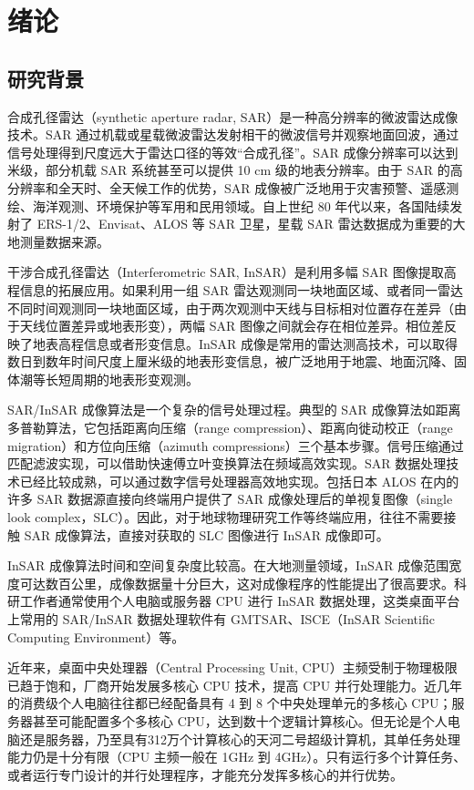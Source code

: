 \chapter{绪论}


\section{研究背景}

合成孔径雷达（synthetic aperture radar, SAR）是一种高分辨率的微波雷达成像技术。SAR 通过机载或星载微波雷达发射相干的微波信号并观察地面回波，通过信号处理得到尺度远大于雷达口径的等效“合成孔径”。SAR 成像分辨率可以达到米级，部分机载 SAR 系统甚至可以提供 10 cm 级的地表分辨率。由于 SAR 的高分辨率和全天时、全天候工作的优势，SAR 成像被广泛地用于灾害预警、遥感测绘、海洋观测、环境保护等军用和民用领域。自上世纪 80 年代以来，各国陆续发射了 ERS-1/2、Envisat、ALOS 等 SAR 卫星，星载 SAR 雷达数据成为重要的大地测量数据来源。

干涉合成孔径雷达（Interferometric SAR, InSAR）是利用多幅 SAR 图像提取高程信息的拓展应用。如果利用一组 SAR 雷达观测同一块地面区域、或者同一雷达不同时间观测同一块地面区域，由于两次观测中天线与目标相对位置存在差异（由于天线位置差异或地表形变），两幅 SAR 图像之间就会存在相位差异。相位差反映了地表高程信息或者形变信息。InSAR 成像是常用的雷达测高技术，可以取得数日到数年时间尺度上厘米级的地表形变信息，被广泛地用于地震、地面沉降、固体潮等长短周期的地表形变观测。

SAR/InSAR 成像算法是一个复杂的信号处理过程。典型的 SAR 成像算法如距离多普勒算法，它包括距离向压缩（range compression）、距离向徙动校正（range migration）和方位向压缩（azimuth compressions）三个基本步骤。信号压缩通过匹配滤波实现，可以借助快速傅立叶变换算法在频域高效实现。SAR 数据处理技术已经比较成熟，可以通过数字信号处理器高效地实现。包括日本 ALOS 在内的许多 SAR 数据源直接向终端用户提供了 SAR 成像处理后的单视复图像（single look complex，SLC）。因此，对于地球物理研究工作等终端应用，往往不需要接触 SAR 成像算法，直接对获取的 SLC 图像进行 InSAR 成像即可。

InSAR 成像算法时间和空间复杂度比较高。在大地测量领域，InSAR 成像范围宽度可达数百公里，成像数据量十分巨大，这对成像程序的性能提出了很高要求。科研工作者通常使用个人电脑或服务器 CPU 进行 InSAR 数据处理，这类桌面平台上常用的 SAR/InSAR 数据处理软件有 GMTSAR、ISCE（InSAR Scientific Computing Environment）等。

近年来，桌面中央处理器（Central Processing Unit, CPU）主频受制于物理极限已趋于饱和，厂商开始发展多核心 CPU 技术，提高 CPU 并行处理能力。近几年的消费级个人电脑往往都已经配备具有 4 到 8 个中央处理单元的多核心 CPU；服务器甚至可能配置多个多核心 CPU，达到数十个逻辑计算核心。但无论是个人电脑还是服务器，乃至具有312万个计算核心的天河二号超级计算机，其单任务处理能力仍是十分有限（CPU 主频一般在 1GHz 到 4GHz）。只有运行多个计算任务、或者运行专门设计的并行处理程序，才能充分发挥多核心的并行优势。

